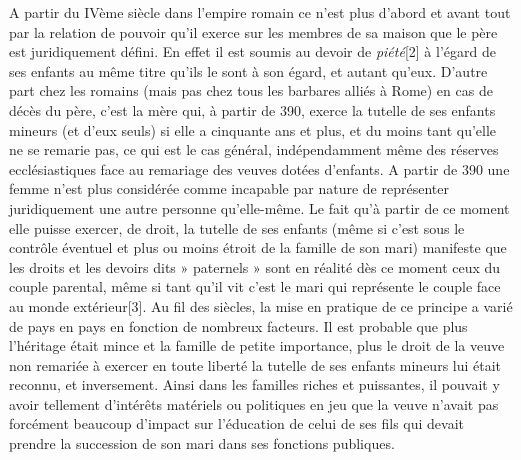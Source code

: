  A partir du IVème siècle dans l'empire romain ce n'est plus d'abord et avant tout par la relation de pouvoir qu'il exerce sur les membres de sa maison que le père est juridiquement défini. En effet il est soumis au devoir de \emph{piété}[2] à l'égard de ses enfants au même titre qu'ils le sont à son égard, et autant qu'eux. D'autre part chez les romains (mais pas chez tous les barbares alliés à Rome) en cas de décès du père, c'est la mère qui, à partir de 390, exerce la tutelle de ses enfants mineurs (et d'eux seuls) si elle a cinquante ans et plus, et du moins tant qu'elle ne se remarie pas, ce qui est le cas général, indépendamment même des réserves ecclésiastiques face au remariage des veuves dotées d'enfants. A partir de 390 une femme n'est plus considérée comme incapable par nature de représenter juridiquement une autre personne qu'elle-même. Le fait qu'à partir de ce moment elle puisse exercer, de droit, la tutelle de ses enfants (même si c'est sous le contrôle éventuel et plus ou moins étroit de la famille de son mari) manifeste que les droits et les devoirs dits » paternels » sont en réalité dès ce moment ceux du couple parental, même si tant qu'il vit c'est le mari qui représente le couple face au monde extérieur[3]. Au fil des siècles, la mise en pratique de ce principe a varié de pays en pays en fonction de nombreux facteurs. Il est probable que plus l'héritage était mince et la famille de petite importance, plus le droit de la veuve non remariée à exercer en toute liberté la tutelle de ses enfants mineurs lui était reconnu, et inversement. Ainsi dans les familles riches et puissantes, il pouvait y avoir tellement d'intérêts matériels ou politiques en jeu que la veuve n'avait pas forcément beaucoup d'impact sur l'éducation de celui de ses fils qui devait prendre la succession de son mari dans ses fonctions publiques. 
